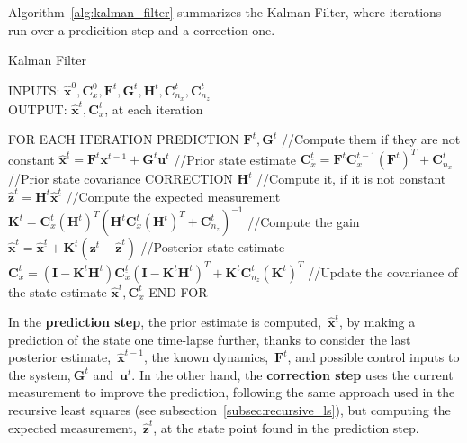 Algorithm~\ref{alg:kalman_filter} summarizes the Kalman Filter, where iterations run over a predicition step and a correction one. 
\begin{algorithm}
\caption{Kalman Filter}
INPUTS: $\hat{\mathbf{x}}^0,\mathbf{C}^0_x,\mathbf{F}^t,\mathbf{G}^t,\mathbf{H}^t,\mathbf{C}^t_{n_x},\mathbf{C}^t_{n_z}$\\
OUTPUT: $\hat{\mathbf{x}}^t,\mathbf{C}^t_x$, at each iteration
\begin{algorithmic}
\STATE FOR EACH ITERATION
\STATE \hspace{0.5cm} PREDICTION
\STATE \hspace{1cm} $\mathbf{F}^t,\mathbf{G}^t$ //Compute them if they are not constant
\STATE \hspace{1cm} $\hat{\mathbf{x}}^{\underline{t}} = \mathbf{F}^t\mathbf{x}^{t-1} + \mathbf{G}^t\mathbf{u}^{t}$ //Prior state estimate
\STATE \hspace{1cm} $\mathbf{C}^{\underline{t}}_x = \mathbf{F}^t\mathbf{C}^{t-1}_x(\mathbf{F}^t)^T + \mathbf{C}^t_{n_x}$ //Prior state covariance
\STATE \hspace{0.5cm} CORRECTION
\STATE \hspace{1cm} $\mathbf{H}^t$ //Compute it, if it is not constant
\STATE \hspace{1cm} $\hat{\mathbf{z}}^t = \mathbf{H}^t\hat{\mathbf{x}}^{\underline{t}}$ //Compute the expected measurement 
\STATE \hspace{1cm} $\mathbf{K}^t = \mathbf{C}^{\underline{t}}_x(\mathbf{H}^t)^T(\mathbf{H}^t\mathbf{C}^{\underline{t}}_x(\mathbf{H}^t)^T+\mathbf{C}^t_{n_z})^{-1}$ 
//Compute the gain
\STATE \hspace{1cm} $\hat{\mathbf{x}}^t = \hat{\mathbf{x}}^{\underline{t}} + \mathbf{K}^t(\mathbf{z}^t - \hat{\mathbf{z}}^t)$ //Posterior state estimate
\STATE \hspace{1cm} $\mathbf{C}^t_{x} = (\mathbf{I}-\mathbf{K}^t\mathbf{H}^t)\mathbf{C}^{\underline{t}}_x(\mathbf{I}-\mathbf{K}^t\mathbf{H}^t)^T
		    + \mathbf{K}^t\mathbf{C}^t_{n_z}(\mathbf{K}^t)^T$ //Update the covariance of the state estimate
\RETURN $\hat{\mathbf{x}}^t,\mathbf{C}^t_x$		    
\STATE END FOR
\end{algorithmic}
\label{alg:kalman_filter}
\end{algorithm}

In the \textbf{prediction step}, the prior estimate is computed,~$\hat{\mathbf{x}}^{\underline{t}}$, by making a prediction of the state one time-lapse further, thanks to consider the last posterior estimate,~$\hat{\mathbf{x}}^{t-1}$, the known dynamics,~$\mathbf{F}^t$, and possible control inputs to the system,$~\mathbf{G}^t$ and~$\mathbf{u}^t$. In the other hand, the \textbf{correction step} uses the current measurement to improve the prediction, following the same approach used in the recursive least squares (see subsection~\ref{subsec:recursive_ls}), but computing the expected measurement,~$\hat{\mathbf{z}}^t$, at the state point found in the prediction step. 

